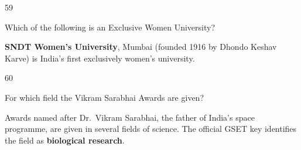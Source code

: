\begin{question}{59}
{Which of the following is an Exclusive Women University?\par}
\begin{explain}
\textbf{SNDT Women's University}, Mumbai (founded 1916 by Dhondo Keshav Karve) is India's first exclusively women's university.
\end{explain}
\end{question}

\begin{question}{60}
{For which field the Vikram Sarabhai Awards are given?\par}
\begin{explain}
Awards named after Dr.~Vikram Sarabhai, the father of India's space programme, are given in several fields of science. The official GSET key identifies the field as \textbf{biological research}.
\end{explain}
\end{question}
